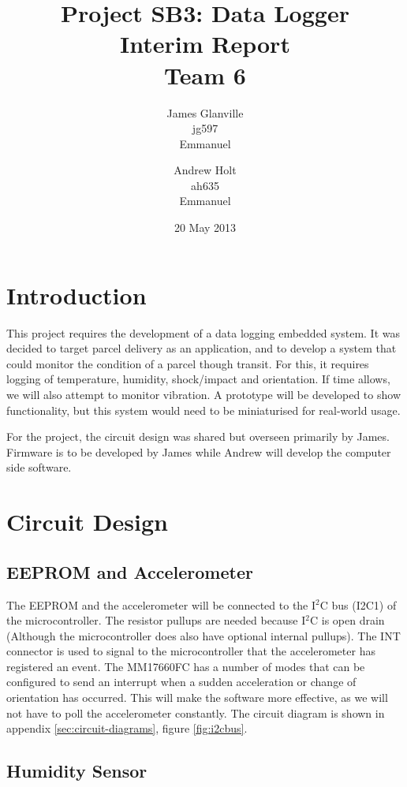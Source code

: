 \documentclass[a4paper,11pt]{article}  %
\title{Project SB3: Data Logger \\
       Interim Report \\
       Team 6}
\author{James Glanville\\
        jg597\\
        Emmanuel\\
        \and
        Andrew Holt\\
        ah635\\
        Emmanuel}
\date{20 May 2013}
\begin{document}
\maketitle

\section{Introduction}

This project requires the development of a data logging embedded
system. It was decided to target parcel delivery as an application,
and to develop a system that could monitor the condition of a parcel
though transit. For this, it requires logging of temperature,
humidity, shock/impact and orientation. If time allows, we will also attempt
to monitor vibration. A prototype will be developed to show
functionality, but this system would need to be miniaturised for
real-world usage.

For the project, the circuit design was shared but overseen
primarily by James. Firmware is to be developed by James while Andrew
will develop the computer side software.

\section{Circuit Design}

\subsection{EEPROM and Accelerometer}

The EEPROM and the accelerometer will be connected to the I$^2$C bus
(I2C1) of the microcontroller. The resistor pullups are needed
because I$^2$C is open drain (Although the microcontroller does also have
optional internal pullups). The INT connector is used to signal to the
microcontroller that the accelerometer has registered an event. The
MM17660FC has a number of modes that can be configured to send an
interrupt when a sudden acceleration or change of orientation has
occurred. This will make the software more effective, as we will not
have to poll the accelerometer constantly. The circuit diagram is
shown in appendix \ref{sec:circuit-diagrams}, figure \ref{fig:i2cbus}.

\subsection{Humidity Sensor}
\end{document}
